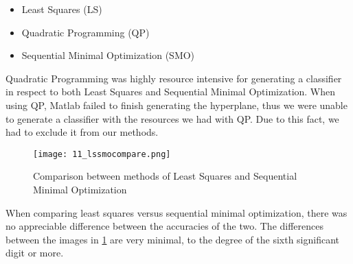 \begin{itemize}
  \item Least Squares (LS)
  \item Quadratic Programming (QP)
  \item Sequential Minimal Optimization (SMO)
\end{itemize}

Quadratic Programming was highly resource intensive for generating a classifier in respect to both Least Squares and Sequential Minimal Optimization. When using QP, Matlab failed to finish generating the hyperplane, thus we were unable to generate a classifier with the resources we had with QP. Due to this fact, we had to exclude it from our methods.

\begin{figure}[ht]
    \centering
    \texttt{[image: 11\_lssmocompare.png]}
    \caption{Comparison between methods of Least Squares and Sequential Minimal Optimization}
    \label{fig:11_lssmocompare}
\end{figure}

When comparing least squares versus sequential minimal optimization, there was no appreciable difference between the accuracies of the two. The differences between the images in \ref{fig:11_lssmocompare} are very minimal, to the degree of the sixth significant digit or more.

